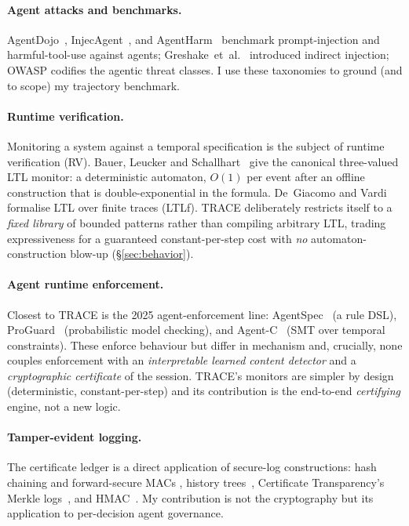 \documentclass[11pt]{article}
\begin{document}
\paragraph{Agent attacks and benchmarks.} AgentDojo~\citep{debenedetti2024agentdojo},
InjecAgent~\citep{zhan2024injecagent}, and AgentHarm~\citep{andriushchenko2024agentharm}
benchmark prompt-injection and harmful-tool-use against agents;
Greshake~et~al.~\citep{greshake2023indirect} introduced indirect injection; OWASP
\citep{owasp2025agentic} codifies the agentic threat classes. I use these
taxonomies to ground (and to scope) my trajectory benchmark.

\paragraph{Runtime verification.} Monitoring a system against a temporal
specification is the subject of runtime verification (RV). Bauer, Leucker and
Schallhart~\citep{bauer2011ltl3} give the canonical three-valued LTL monitor: a
deterministic automaton, $O(1)$ per event after an offline construction that is
double-exponential in the formula. De~Giacomo and Vardi~\citep{degiacomo2013ltlf}
formalise LTL over finite traces (LTLf). TRACE deliberately restricts itself to a
\emph{fixed library} of bounded patterns rather than compiling arbitrary LTL,
trading expressiveness for a guaranteed constant-per-step cost with \emph{no}
automaton-construction blow-up (\S\ref{sec:behavior}).

\paragraph{Agent runtime enforcement.} Closest to TRACE is the 2025
agent-enforcement line: AgentSpec~\citep{wang2025agentspec} (a rule DSL),
ProGuard~\citep{wang2025proguard} (probabilistic model checking), and
Agent-C~\citep{kamath2025agentc} (SMT over temporal constraints). These enforce
behaviour but differ in mechanism and, crucially, none couples enforcement with
an \emph{interpretable learned content detector} and a \emph{cryptographic
certificate} of the session. TRACE's monitors are simpler by design (deterministic,
constant-per-step) and its contribution is the end-to-end \emph{certifying}
engine, not a new logic.

\paragraph{Tamper-evident logging.} The certificate ledger is a direct
application of secure-log constructions: hash chaining and forward-secure MACs
\citep{schneier1998securelogs}, history trees~\citep{crosby2009historytree},
Certificate Transparency's Merkle logs~\citep{laurie2013ct}, and
HMAC~\citep{krawczyk1997hmac}. My contribution is not the cryptography but its
application to per-decision agent governance.
\end{document}
